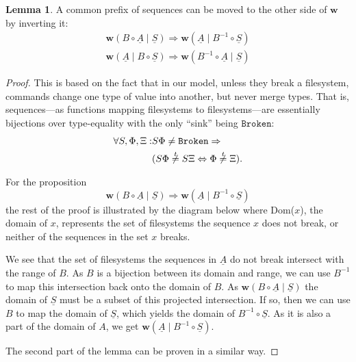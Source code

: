 \documentclass[12pt]{article}
\newcommand{\fsbroken}{\mathtt{Broken}} %
\newcommand{\FS}{\Phi} %
\newcommand{\GS}{\Xi} %
\newcommand{\cc}{\circ} %
\newcommand{\workssign}{\mathbf{w}}
\newcommand{\worksc}[2]{\workssign({#1}\mathrel{|}{#2})}
\newcommand{\ntypeeq}{\centernot{\stackrel{t}{=}}}
\newcommand{\seqset}[1]{\underline{#1}} %
\theoremstyle{definition}
\newtheorem{mylem}{Lemma}
\begin{document}
\begin{mylem}\label{r_invmove}
A common prefix of sequences can be moved to the other side of $\workssign$ by inverting it:
\begin{gather*}
\worksc{B\cc \seqset{A}}{\seqset{S}} \Rightarrow \worksc{\seqset{A}}{B^{-1}\cc \seqset{S}} \\
\worksc{\seqset{A}}{B\cc \seqset{S}} \Rightarrow \worksc{B^{-1}\cc \seqset{A}}{\seqset{S}}
\end{gather*}
\end{mylem}
\begin{proof}
This is based on the fact that in our model, unless they break a filesystem,
commands change one type of value into another, but never merge types.
That is,
sequences---as functions mapping filesystems to filesystems---are
essentially bijections over type-equality
with the only ``sink'' being $\fsbroken$:
\begin{align*}
\forall S,\FS,\GS: &S\FS\neq\fsbroken \Rightarrow \\
&(S\FS\ntypeeq S\GS \Leftrightarrow \FS\ntypeeq \GS).
\end{align*}

For the proposition
\[ \worksc{B\cc \seqset{A}}{\seqset{S}} \Rightarrow \worksc{\seqset{A}}{B^{-1}\cc \seqset{S}} \]
the rest of the proof is illustrated by the diagram below
where Dom($x$), the domain of $x$, represents the set of filesystems
the sequence $x$ does not break, or neither of the sequences in the set $x$ breaks.


We see that the set of filesystems the sequences in $\seqset{A}$ do not break intersect with the range of $B$.
As $B$ is a bijection between its domain and range, we can use $B^{-1}$ to map this intersection back
onto the domain of $B$.
As $\worksc{B\cc \seqset{A}}{\seqset{S}}$ the domain of $\seqset{S}$ must be a subset of this
projected intersection.
If so, then we can use $B$ to map the domain of $\seqset{S}$, which yields the domain of $B^{-1}\cc \seqset{S}$.
As it is also a part of the domain of $A$, we get $\worksc{\seqset{A}}{B^{-1}\cc \seqset{S}}$.

The second part of the lemma can be proven in a similar way.
\end{proof}
\end{document}
